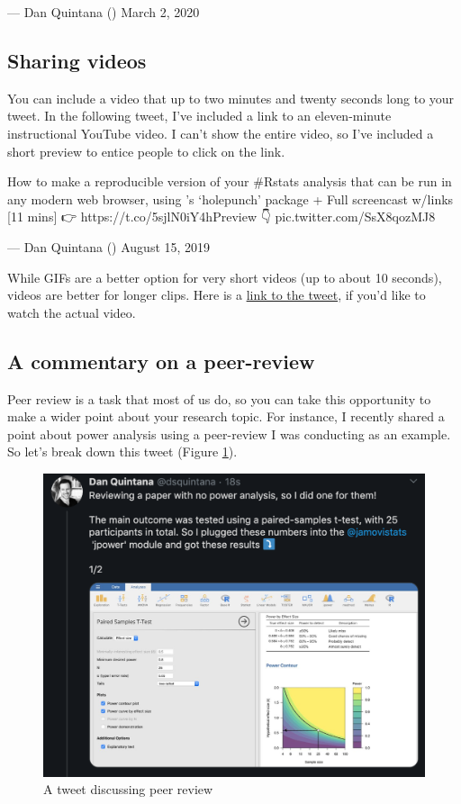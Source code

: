 \documentclass[]{book}
\begin{document}
--- Dan Quintana (\citet{dsquintana}) March 2, 2020

\hypertarget{sharing-videos}{%
\subsection{Sharing videos}\label{sharing-videos}}

You can include a video that up to two minutes and twenty seconds long to your tweet. In the following tweet, I've included a link to an eleven-minute instructional YouTube video. I can't show the entire video, so I've included a short preview to entice people to click on the link.

How to make a reproducible version of your \#Rstats analysis that can be run in any modern web browser, using \citet{_inundata}'s `holepunch' package + \citet{mybinderteam} Full screencast w/links {[}11 mins{]} 👉 https://t.co/5sjlN0iY4hPreview 👇 pic.twitter.com/SsX8qozMJ8

--- Dan Quintana (\citet{dsquintana}) August 15, 2019

While GIFs are a better option for very short videos (up to about 10 seconds), videos are better for longer clips. Here is a \href{https://twitter.com/dsquintana/status/1162002047794864128?s=20}{link to the tweet}, if you'd like to watch the actual video.

\hypertarget{a-commentary-on-a-peer-review}{%
\subsection{A commentary on a peer-review}\label{a-commentary-on-a-peer-review}}

Peer review is a task that most of us do, so you can take this opportunity to make a wider point about your research topic. For instance, I recently shared a point about power analysis using a peer-review I was conducting as an example. So let's break down this tweet (Figure \ref{fig:power}).

\begin{figure}

{\centering \includegraphics[width=0.8\linewidth]{images/power} 

}

\caption{A tweet discussing peer review}\label{fig:power}
\end{figure}
\end{document}
